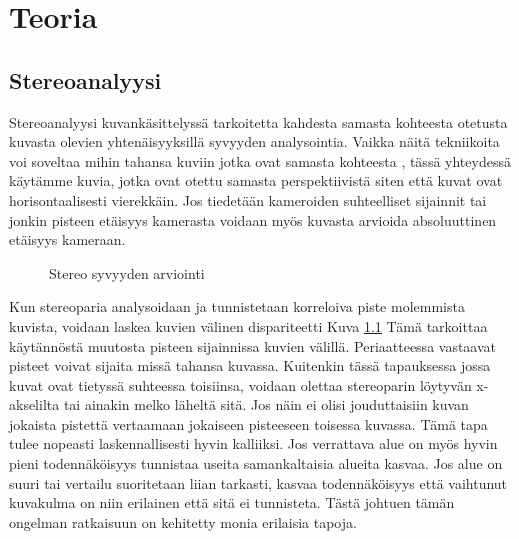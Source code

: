 \chapter{Teoria}%
\label{ch:teoria}

\section{Stereoanalyysi}

Stereoanalyysi kuvankäsittelyssä tarkoitetta kahdesta samasta kohteesta otetusta kuvasta olevien yhtenäisyyksillä syvyyden analysointia.
Vaikka näitä tekniikoita voi soveltaa mihin tahansa kuviin jotka ovat samasta kohteesta \cite{SumiYasushi20023ORi},
tässä yhteydessä käytämme kuvia,
jotka ovat otettu samasta perspektiivistä siten että kuvat ovat horisontaalisesti vierekkäin.
Jos tiedetään kameroiden suhteelliset sijainnit tai jonkin pisteen etäisyys kamerasta voidaan myös kuvasta arvioida absoluuttinen etäisyys kameraan. 

\begin{figure}[h]
\centering
{}
\caption{Stereo syvyyden arviointi}
\label{fig:stereo}
\end{figure}
    
Kun stereoparia analysoidaan ja tunnistetaan korreloiva piste molemmista kuvista,
voidaan laskea kuvien välinen dispariteetti Kuva \ref{fig:stereo}
Tämä tarkoittaa käytännöstä muutosta pisteen sijainnissa kuvien välillä.
Periaatteessa vastaavat pisteet voivat sijaita missä tahansa kuvassa.
Kuitenkin tässä tapauksessa jossa kuvat ovat tietyssä suhteessa toisiinsa,
voidaan olettaa stereoparin löytyvän x-akselilta tai ainakin melko läheltä sitä.
Jos näin ei olisi jouduttaisiin kuvan jokaista pistettä vertaamaan jokaiseen pisteeseen toisessa kuvassa.
Tämä tapa tulee nopeasti laskennallisesti hyvin kalliiksi.
Jos verrattava alue on myös hyvin pieni todennäköisyys tunnistaa useita samankaltaisia alueita kasvaa.
Jos alue on suuri tai vertailu suoritetaan liian tarkasti,
kasvaa todennäköisyys että vaihtunut kuvakulma on niin erilainen että sitä ei tunnisteta.
Tästä johtuen tämän ongelman ratkaisuun on kehitetty monia erilaisia tapoja.


